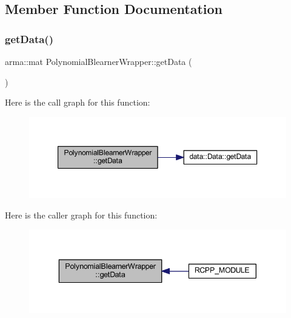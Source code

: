 \subsection{Member Function Documentation}
\mbox{\label{class_polynomial_blearner_wrapper_a56c92d1dee5e610657437766c13a6a5d}} 
\subsubsection{\texorpdfstring{get\+Data()}{getData()}}
{\footnotesize\ttfamily arma\+::mat Polynomial\+Blearner\+Wrapper\+::get\+Data (\begin{DoxyParamCaption}{ }\end{DoxyParamCaption})\hspace{0.3cm}{\ttfamily [inline]}}

Here is the call graph for this function\+:\nopagebreak
\begin{figure}[H]
\begin{center}
\leavevmode
\includegraphics[width=350pt]{class_polynomial_blearner_wrapper_a56c92d1dee5e610657437766c13a6a5d_cgraph}
\end{center}
\end{figure}
Here is the caller graph for this function\+:\nopagebreak
\begin{figure}[H]
\begin{center}
\leavevmode
\includegraphics[width=343pt]{class_polynomial_blearner_wrapper_a56c92d1dee5e610657437766c13a6a5d_icgraph}
\end{center}
\end{figure}
\mbox{\label{class_polynomial_blearner_wrapper_a40ee4c7ab2c7230d96577d3a588b262f}} 
